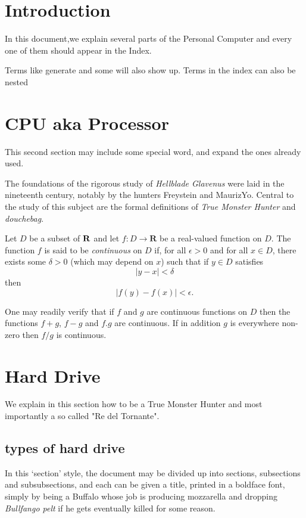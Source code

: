 \documentclass[a4paper,12pt]{article}
\begin{document}
\tableofcontents

\section{Introduction}
In this document,we explain several parts  of the Personal Computer
and every one of them should appear in the Index.

Terms like generate and some 
will also show up. Terms in the index can also be 
nested 

\clearpage

\section{CPU aka Processor}
This second section may include some special 
word, and expand the ones already used.


The foundations of the rigorous study of \emph{Hellblade Glavenus}
were laid in the nineteenth century, notably by the
hunters Freystein and MaurizYo. Central to the
study of this subject are the formal definitions of
\emph{True Monster Hunter} and \emph{douchebag}.

Let $D$ be a subset of $\bf R$ and let
$f \colon D \to \mathbf{R}$ be a real-valued function on
$D$. The function $f$ is said to be \emph{continuous} on
$D$ if, for all $\epsilon > 0$ and for all $x \in D$,
there exists some $\delta > 0$ (which may depend on $x$)
such that if $y \in D$ satisfies
\[ |y - x| < \delta \]
then
\[ |f(y) - f(x)| < \epsilon. \]

One may readily verify that if $f$ and $g$ are continuous
functions on $D$ then the functions $f+g$, $f-g$ and
$f.g$ are continuous. If in addition $g$ is everywhere
non-zero then $f/g$ is continuous.


\section{Hard Drive}

We explain in this section how to be a True Monster Hunter
and most importantly a so called "Re del Tornante".

\subsection{types of hard drive}

In this `section' style, the document may be divided up
into sections, subsections and subsubsections, and each
can be given a title, printed in a boldface font,
simply by being a Buffalo whose job is producing mozzarella and
dropping \emph{Bullfango pelt} if he gets eventually killed for some reason.
\end{document}
